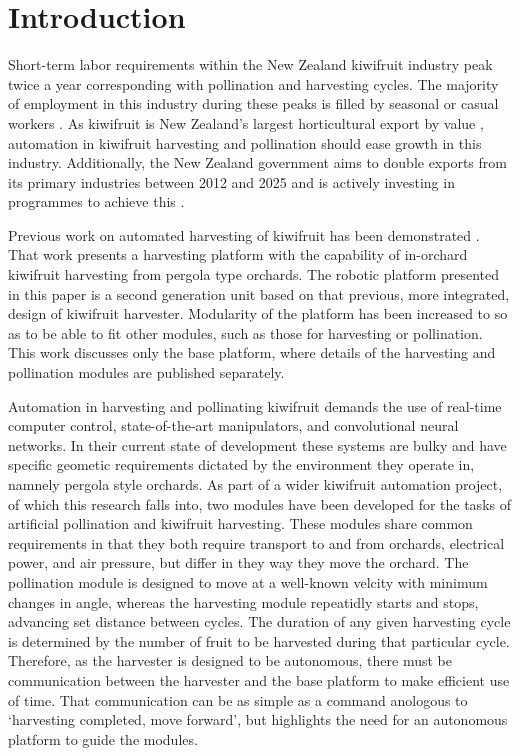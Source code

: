 \documentclass[preprint,authoryear,12pt]{elsarticle}
\begin{document}

\section{Introduction}
\label{sect:intro}
    Short-term labor requirements within the New Zealand kiwifruit industry peak twice a year corresponding with pollination and harvesting cycles.
    The majority of employment in this industry during these peaks is filled by seasonal or casual workers \citep{Timmins2009}.
    As kiwifruit is New Zealand's largest horticultural export by value \citep{StatisticsNewZealand2015}, automation in kiwifruit harvesting and pollination should ease growth in this industry.
    Additionally, the New Zealand government aims to double exports from its primary industries between 2012 and 2025 and is actively investing in programmes to achieve this \citep{MinistryPrimaryIndustries2015}.

    Previous work on automated harvesting of kiwifruit has been demonstrated \citep{Scarfe2012,scarfe2009}.
    That work presents a harvesting platform with the capability of in-orchard kiwifruit harvesting from pergola type orchards.
    The robotic platform presented in this paper is a second generation unit based on that previous, more integrated, design of kiwifruit harvester.
    Modularity of the platform has been increased to so as to be able to fit other modules, such as those for harvesting or pollination.
    This work discusses only the base platform, where details of the harvesting and pollination modules are published separately.

    Automation in harvesting and pollinating kiwifruit demands the use of real-time computer control, state-of-the-art manipulators, and convolutional neural networks.
    In their current state of development these systems are bulky and have specific geometic requirements dictated by the environment they operate in, namnely pergola style orchards.
    As part of a wider kiwifruit automation project, of which this research falls into, two modules have been developed for the tasks of artificial pollination and kiwifruit harvesting.
    These modules share common requirements in that they both require transport to and from orchards, electrical power, and air pressure, but differ in they way they move the orchard.
    The pollination module is designed to move at a well-known velcity with minimum changes in angle, whereas the harvesting module repeatidly starts and stops, advancing set distance between cycles.
    The duration of any given harvesting cycle is determined by the number of fruit to be harvested during that particular cycle.
    Therefore, as the harvester is designed to be autonomous, there must be communication between the harvester and the base platform to make efficient use of time.
    That communication can be as simple as a command anologous to `harvesting completed, move forward', but highlights the need for an autonomous platform to guide the modules.
\end{document}
